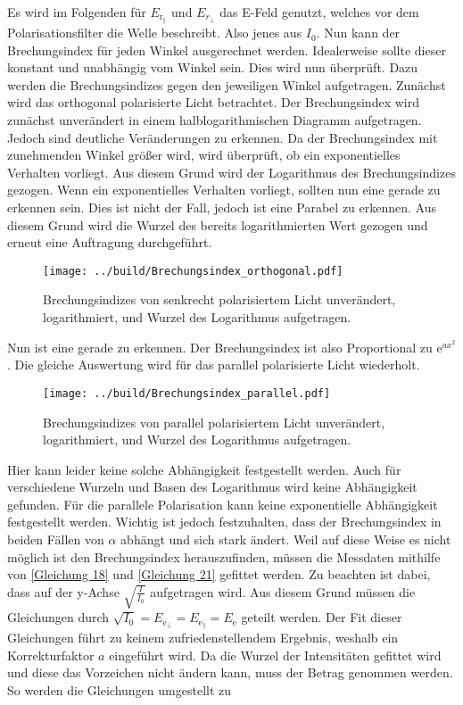 \noindent Es wird im Folgenden für $E_{\text{r}_\parallel}$ und $E_{r_\bot}$ das E-Feld genutzt, welches vor dem Polarisationsfilter die Welle beschreibt. Also jenes aus $I_0$.
Nun kann der Brechungsindex für jeden Winkel ausgerechnet werden. Idealerweise sollte dieser konstant und unabhängig vom Winkel sein. Dies wird nun überprüft. Dazu werden 
die Brechungsindizes gegen den jeweiligen Winkel aufgetragen. Zunächst wird das orthogonal polarisierte Licht betrachtet.
Der Brechungsindex wird zunächst unverändert in einem halblogarithmischen Diagramm aufgetragen. Jedoch sind deutliche Veränderungen zu erkennen. 
Da der Brechungsindex mit zunehmenden Winkel größer wird, wird überprüft, ob ein exponentielles Verhalten vorliegt. Aus diesem Grund wird der Logarithmus 
des Brechungsindizes gezogen. Wenn ein exponentielles Verhalten vorliegt, sollten nun eine gerade zu erkennen sein. Dies ist nicht der Fall, jedoch ist eine Parabel zu erkennen. 
Aus diesem Grund wird die Wurzel des bereits logarithmierten Wert gezogen und erneut eine Auftragung durchgeführt. 

\begin{figure}[H]
    \centering
    \texttt{[image: ../build/Brechungsindex\_orthogonal.pdf]}
    \caption{Brechungsindizes von senkrecht polarisiertem Licht unverändert, logarithmiert, und Wurzel des Logarithmus aufgetragen.}
\end{figure}

\noindent Nun ist eine gerade zu erkennen. Der Brechungsindex ist also Proportional zu $\text{e}^{ax^2}$. Die gleiche Auswertung wird für das parallel polarisierte Licht 
wiederholt. 

\begin{figure}[H]
    \centering
    \texttt{[image: ../build/Brechungsindex\_parallel.pdf]}
    \caption{Brechungsindizes von parallel polarisiertem Licht unverändert, logarithmiert, und Wurzel des Logarithmus aufgetragen.}
\end{figure}

\noindent Hier kann leider keine solche Abhängigkeit festgestellt werden. Auch für verschiedene Wurzeln und Basen des Logarithmus wird keine Abhängigkeit gefunden.
Für die parallele Polarisation kann keine exponentielle Abhängigkeit festgestellt werden. 
Wichtig ist jedoch festzuhalten, dass der Brechungsindex in beiden Fällen von $\alpha$ abhängt und sich stark ändert. 
Weil auf diese Weise es nicht möglich ist den Brechungsindex herauszufinden, müssen die Messdaten mithilfe von \eqref{Gleichung 18} und \eqref{Gleichung 21} gefittet werden. 
Zu beachten ist dabei, dass auf der y-Achse $\sqrt{\frac{I}{I_0}}$ aufgetragen wird. Aus diesem Grund müssen die Gleichungen durch 
$\sqrt{I_0} = E_{\text{e}_\bot} = E_{\text{e}_\parallel} =  E_\text{e}$ geteilt werden.
Der Fit dieser Gleichungen führt zu keinem zufriedenstellendem Ergebnis, weshalb ein Korrekturfaktor $a$ eingeführt wird. Da die Wurzel der Intensitäten gefittet wird und diese 
das Vorzeichen nicht ändern kann, muss der Betrag genommen werden. So werden die Gleichungen umgestellt zu

